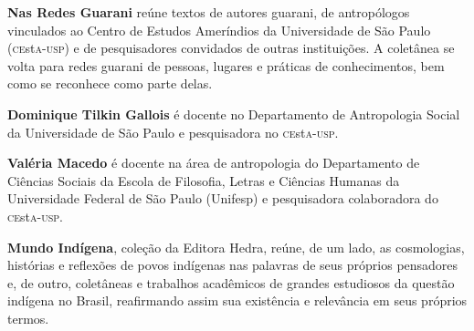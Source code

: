 \textbf{Nas Redes Guarani} reúne textos de autores guarani, de antropólogos vinculados ao Centro de Estudos Ameríndios da Universidade de São Paulo (\textsc{ce}st\textsc{a}-\textsc{usp}) e de pesquisadores convidados de outras instituições. A coletânea se volta para redes guarani de pessoas, lugares e práticas de conhecimentos, bem como se reconhece como parte delas.

\textbf{Dominique Tilkin Gallois} é docente no Departamento de Antropologia Social da Universidade de São Paulo e pesquisadora no \textsc{ce}st\textsc{a}-\textsc{usp}.

\textbf{Valéria Macedo} é docente na área de antropologia do Departamento de Ciências Sociais da Escola de Filosofia, Letras e Ciências Humanas da Universidade Federal de São Paulo (Unifesp) e pesquisadora colaboradora do \textsc{ce}st\textsc{a}-\textsc{usp}.

\textbf{Mundo Indígena}, coleção da Editora Hedra, reúne, de um lado, as cosmologias, histórias
e reflexões de povos indígenas nas palavras de seus próprios pensadores e, de outro, coletâneas
e trabalhos acadêmicos de grandes estudiosos da questão indígena no Brasil, reafirmando assim sua
existência e relevância em seus próprios termos.\par
